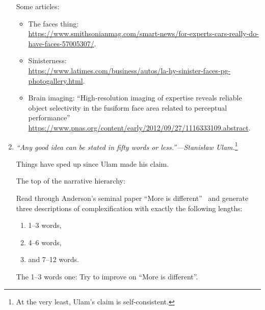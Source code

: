 \begin{enumerate}
\begin{enumerate}
  \end{enumerate}

  Some articles:
  \begin{itemize}
  \item
    The faces thing:\\
    \url{https://www.smithsonianmag.com/smart-news/for-experts-cars-really-do-have-faces-57005307/}.
  \item 
    Sinisterness:\\
    \url{https://www.latimes.com/business/autos/la-hy-sinister-faces-pg-photogallery.html}.
  \item
    Brain imaging:
    ``High-resolution imaging of expertise reveals reliable object selectivity in the fusiform face area related to perceptual performance''\\
    \url{https://www.pnas.org/content/early/2012/09/27/1116333109.abstract}.
  \end{itemize}

  
   \solutionstart


   \solutionend


\item

  \textit{``Any good idea can be stated in fifty words or less.''---Stanis{\l}aw Ulam.}\footnote{At the very least, Ulam's claim is self-consistent.}

  Things have sped up since Ulam made his claim.

  The top of the narrative hierarchy:

  Read through Anderson's seminal paper ``More is different''~\cite{anderson1972a}
  and generate three descriptions of complexification with exactly the following lengths:
  \begin{enumerate}
  \item 
    1--3 words,
  \item 
    4--6 words,
  \item 
    and
    7--12 words.
  \end{enumerate}

  The 1--3 words one: Try to improve on ``More is different''.







\end{enumerate}
